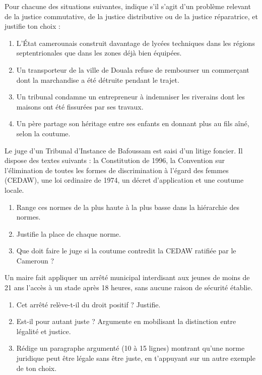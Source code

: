 \documentclass[11pt]{article}
\begin{document}
\begin{exercice}
Pour chacune des situations suivantes, indique s'il s'agit d'un problème relevant de la justice commutative, de la justice distributive ou de la justice réparatrice, et justifie ton choix :
\begin{enumerate}
\item L'État camerounais construit davantage de lycées techniques dans les régions septentrionales que dans les zones déjà bien équipées.
\item Un transporteur de la ville de Douala refuse de rembourser un commerçant dont la marchandise a été détruite pendant le trajet.
\item Un tribunal condamne un entrepreneur à indemniser les riverains dont les maisons ont été fissurées par ses travaux.
\item Un père partage son héritage entre ses enfants en donnant plus au fils aîné, selon la coutume.
\end{enumerate}
\end{exercice}

\begin{exercice}
Le juge d'un Tribunal d'Instance de Bafoussam est saisi d'un litige foncier. Il dispose des textes suivants : la Constitution de 1996, la Convention sur l'élimination de toutes les formes de discrimination à l'égard des femmes (CEDAW), une loi ordinaire de 1974, un décret d'application et une coutume locale.
\begin{enumerate}
\item Range ces normes de la plus haute à la plus basse dans la hiérarchie des normes.
\item Justifie la place de chaque norme.
\item Que doit faire le juge si la coutume contredit la CEDAW ratifiée par le Cameroun ?
\end{enumerate}
\end{exercice}

\begin{exercice}
Un maire fait appliquer un arrêté municipal interdisant aux jeunes de moins de 21 ans l'accès à un stade après 18 heures, sans aucune raison de sécurité établie.
\begin{enumerate}
\item Cet arrêté relève-t-il du droit positif ? Justifie.
\item Est-il pour autant juste ? Argumente en mobilisant la distinction entre légalité et justice.
\item Rédige un paragraphe argumenté (10 à 15 lignes) montrant qu'une norme juridique peut être légale sans être juste, en t'appuyant sur un autre exemple de ton choix.
\end{enumerate}
\end{exercice}
\end{document}
